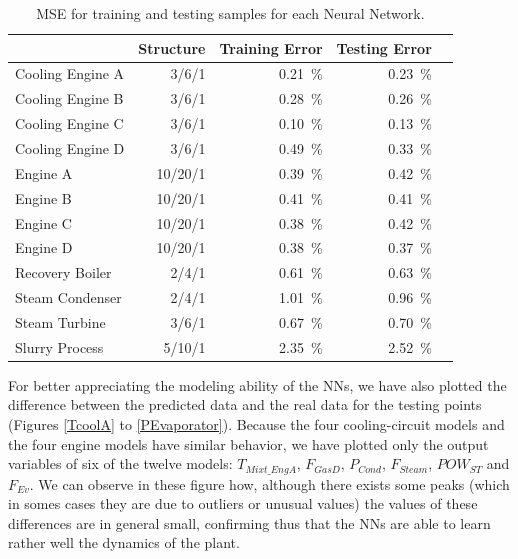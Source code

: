 \begin{table}[!t]
\caption{MSE for training and testing samples for each Neural Network.}
\label{tbl:mse}
  \centering
\begin{tabular}{lrrrr} \toprule
 & Structure  & Training Error & Testing Error \\ \midrule
Cooling Engine A & 3/6/1 & \SI{0.21}{\percent} & \SI{0.23}{\percent} \\
Cooling Engine B & 3/6/1  & \SI{0.28}{\percent} & \SI{0.26}{\percent} \\
Cooling Engine C & 3/6/1  & \SI{0.10}{\percent} & \SI{0.13}{\percent} \\
Cooling Engine D & 3/6/1  & \SI{0.49}{\percent} & \SI{0.33}{\percent} \\
 Engine A & 10/20/1  & \SI{0.39}{\percent} & \SI{0.42}{\percent} \\
 Engine B & 10/20/1  & \SI{0.41}{\percent} & \SI{0.41}{\percent} \\
 Engine C & 10/20/1  & \SI{0.38}{\percent} & \SI{0.42}{\percent} \\
 Engine D & 10/20/1  & \SI{0.38}{\percent} & \SI{0.37}{\percent} \\
 Recovery Boiler & 2/4/1  & \SI{0.61}{\percent} & \SI{0.63}{\percent} \\
 Steam Condenser & 2/4/1  & \SI{1.01}{\percent} & \SI{0.96}{\percent} \\
 Steam Turbine & 3/6/1  & \SI{0.67}{\percent} & \SI{0.70}{\percent} \\
 Slurry Process & 5/10/1  & \SI{2.35}{\percent} & \SI{2.52}{\percent} \\
 \bottomrule
\end{tabular}
\vspace{-0.3cm}

\end{table}

For better appreciating the modeling ability of the NNs, we have also plotted the difference between the predicted data and the real data for the testing points (Figures \ref{TcoolA} to \ref{PEvaporator}). Because the four cooling-circuit models and the four engine models have  similar behavior, we have plotted only the output variables of six of the twelve models: $T_{Mixt\_EngA}$, $F_{GasD}$, $P_{Cond}$, $F_{Steam}$, $POW_{ST}$ and $F_{Ev}$.  We can observe in these figure how, although there exists some peaks (which in somes cases they are due to outliers or unusual values) the values of these differences are in general small, confirming thus that the NNs are able to learn rather well the dynamics of the plant.


